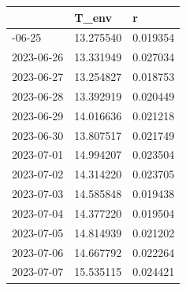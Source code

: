 \documentclass[
  letterpaper,
  DIV=11,
  numbers=noendperiod,
  oneside]{scrreprt}
\begin{document}
\begin{longtable}[]{@{}lll@{}}
\toprule\noalign{}
& T\_env & r \\
\midrule\noalign{}
\endhead
\bottomrule\noalign{}
\endlastfoot
2023-06-25 & 13.275540 & 0.019354 \\
2023-06-26 & 13.331949 & 0.027034 \\
2023-06-27 & 13.254827 & 0.018753 \\
2023-06-28 & 13.392919 & 0.020449 \\
2023-06-29 & 14.016636 & 0.021218 \\
2023-06-30 & 13.807517 & 0.021749 \\
2023-07-01 & 14.994207 & 0.023504 \\
2023-07-02 & 14.314220 & 0.023705 \\
2023-07-03 & 14.585848 & 0.019438 \\
2023-07-04 & 14.377220 & 0.019504 \\
2023-07-05 & 14.814939 & 0.021202 \\
2023-07-06 & 14.667792 & 0.022264 \\
2023-07-07 & 15.535115 & 0.024421 \\
\end{longtable}
\end{document}
